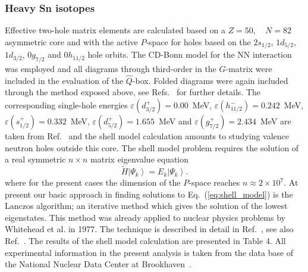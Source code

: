 \subsubsection{Heavy Sn isotopes}

Effective two-hole matrix elements are calculated based on 
a $Z = 50, \quad N = 82$ asymmetric core and 
with the active $P$-space for holes
based on the $2s_{1/2}$, $1d_{5/2}$, $1d_{3/2}$, $0g_{7/2}$ and $0h_{11/2}$
hole orbits. The CD-Bonn model for the NN interaction was employed
\cite{cdbonn} and all diagrams through third-order in the $G$-matrix
were included in the evaluation of the $\hat{Q}$-box. Folded diagrams
were again included through the method exposed above, see
Refs.\ \cite{hko95,ehho98} for further details.
The corresponding single-hole energies
$\varepsilon(d_{3/2}^{+}) = 0.00$~MeV, 
 $\varepsilon(h_{11/2}^{-}) = 0.242$~MeV, 
$\varepsilon(s_{1/2}^{+}) = 0.332$~MeV,
$\varepsilon(d_{5/2}^{+}) = 1.655$~MeV and  
$\varepsilon(g_{7/2}^{+}) = 2.434$~MeV
are taken from \mbox{Ref. \cite{jan}}
and the shell model calculation amounts to studying
valence neutron holes outside this core.
The shell model problem requires the solution of a real symmetric
$n \times n$ matrix eigenvalue equation
\begin{equation}
       \widetilde{H}\left | \Psi_k\right\rangle  = 
       E_k \left | \Psi_k\right\rangle .
       \label{eq:shell_model}
\end{equation}
where for the present cases the dimension of 
the $P$-space reaches $n \approx 2 \times 10^{7}$.
At present our basic approach in finding 
solutions to Eq.\ (\ref{eq:shell_model})
is the Lanczos algorithm; an iterative method
which gives the solution of the lowest eigenstates. This method was 
already applied to nuclear physics problems by Whitehead et al. 
in 1977. The technique is described in detail in Ref.\ \cite{whit77},
see also Ref.\ \cite{ehho95}.
The results of the shell model calculation are presented in Table 4.
All experimental information in the present analysis is taken 
from the data base of the 
National Nuclear Data Center at \mbox{Brookhaven \cite{brook}}. 
